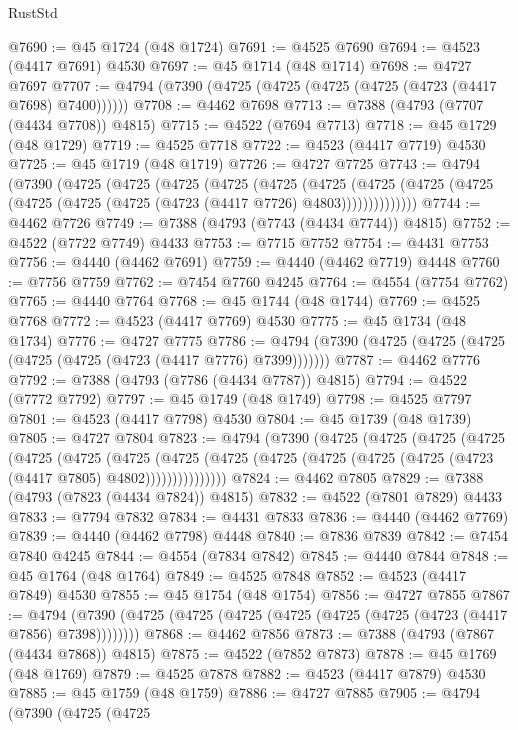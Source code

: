 \begin{lexlean}{RustStd}
\begin{coremodule}
@7690 := @45 @1724 (@48 @1724)
@7691 := @4525 @7690
@7694 := @4523 (@4417 @7691) @4530
@7697 := @45 @1714 (@48 @1714)
@7698 := @4727 @7697
@7707 := @4794 (@7390 (@4725 (@4725 (@4725 (@4725 (@4723 (@4417 @7698) @7400))))))
@7708 := @4462 @7698
@7713 := @7388 (@4793 (@7707 (@4434 @7708)) @4815)
@7715 := @4522 (@7694 @7713)
@7718 := @45 @1729 (@48 @1729)
@7719 := @4525 @7718
@7722 := @4523 (@4417 @7719) @4530
@7725 := @45 @1719 (@48 @1719)
@7726 := @4727 @7725
@7743 := @4794
    (@7390
      (@4725
        (@4725
          (@4725
            (@4725
              (@4725
                (@4725
                  (@4725 (@4725 (@4725 (@4725 (@4725 (@4725 (@4723 (@4417 @7726) @4803))))))))))))))
@7744 := @4462 @7726
@7749 := @7388 (@4793 (@7743 (@4434 @7744)) @4815)
@7752 := @4522 (@7722 @7749) @4433
@7753 := @7715 @7752
@7754 := @4431 @7753
@7756 := @4440 (@4462 @7691)
@7759 := @4440 (@4462 @7719) @4448
@7760 := @7756 @7759
@7762 := @7454 @7760 @4245
@7764 := @4554 (@7754 @7762)
@7765 := @4440 @7764
@7768 := @45 @1744 (@48 @1744)
@7769 := @4525 @7768
@7772 := @4523 (@4417 @7769) @4530
@7775 := @45 @1734 (@48 @1734)
@7776 := @4727 @7775
@7786 := @4794 (@7390 (@4725 (@4725 (@4725 (@4725 (@4725 (@4723 (@4417 @7776) @7399)))))))
@7787 := @4462 @7776
@7792 := @7388 (@4793 (@7786 (@4434 @7787)) @4815)
@7794 := @4522 (@7772 @7792)
@7797 := @45 @1749 (@48 @1749)
@7798 := @4525 @7797
@7801 := @4523 (@4417 @7798) @4530
@7804 := @45 @1739 (@48 @1739)
@7805 := @4727 @7804
@7823 := @4794
    (@7390
      (@4725
        (@4725
          (@4725
            (@4725
              (@4725
                (@4725
                  (@4725
                    (@4725
                      (@4725 (@4725 (@4725 (@4725 (@4725 (@4723 (@4417 @7805) @4802)))))))))))))))
@7824 := @4462 @7805
@7829 := @7388 (@4793 (@7823 (@4434 @7824)) @4815)
@7832 := @4522 (@7801 @7829) @4433
@7833 := @7794 @7832
@7834 := @4431 @7833
@7836 := @4440 (@4462 @7769)
@7839 := @4440 (@4462 @7798) @4448
@7840 := @7836 @7839
@7842 := @7454 @7840 @4245
@7844 := @4554 (@7834 @7842)
@7845 := @4440 @7844
@7848 := @45 @1764 (@48 @1764)
@7849 := @4525 @7848
@7852 := @4523 (@4417 @7849) @4530
@7855 := @45 @1754 (@48 @1754)
@7856 := @4727 @7855
@7867 := @4794 (@7390 (@4725 (@4725 (@4725 (@4725 (@4725 (@4725 (@4723 (@4417 @7856) @7398))))))))
@7868 := @4462 @7856
@7873 := @7388 (@4793 (@7867 (@4434 @7868)) @4815)
@7875 := @4522 (@7852 @7873)
@7878 := @45 @1769 (@48 @1769)
@7879 := @4525 @7878
@7882 := @4523 (@4417 @7879) @4530
@7885 := @45 @1759 (@48 @1759)
@7886 := @4727 @7885
@7905 := @4794
    (@7390
      (@4725
        (@4725

\end{coremodule}
\end{lexlean}
